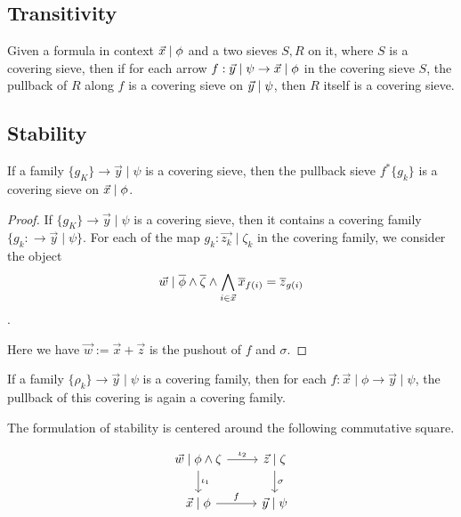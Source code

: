 \subsection{Transitivity}
\begin{lemma}[Transitivity]
  Given a formula in context $\vec{x}\mid\phi$ and a two sieves $S,R$ on it, where $S$ is a covering sieve, then if for each arrow $f:\vec{y}\mid\psi\to\vec{x}\mid\phi$ in the
  covering sieve $S$, the pullback of $R$ along $f$ is a covering sieve on $\vec{y}\mid\psi$, then $R$ itself is a covering sieve.
\end{lemma}



\subsection{Stability}



\begin{theorem}
  If a family $\{g_K\}\to \vec{y}\mid \psi$ is a covering sieve, then the pullback sieve $f^*\{g_k\}$ is a covering sieve on $\vec{x}\mid\phi$.
\end{theorem}

\begin{proof}
  If $\{g_K\}\to \vec{y}\mid \psi$ is a covering sieve, then it contains a covering family $\{g_k: \to \vec{y}\mid \psi\}$.
  For each of the map $g_{k}:\vec{z_k}\mid \zeta_k$ in the covering family, we consider the object 
  \[\vec{w}\mid \overline{\phi}\land \overline{\zeta} \land\bigwedge_{i\in \vec{x}} \overline{x}_{f(i)} = \overline{z}_{g(i)}\]. 

  Here we have $\vec{w}:= \vec{x}+ \vec{z}$ is the pushout of $f$ and $\sigma$.
\end{proof}

\begin{lemma}
  If a family $\{\rho_k\}\to \vec{y}\mid \psi$ is a covering family, then for each $f: \vec{x}\mid \phi\to \vec{y}\mid\psi$, the pullback of this covering is again a covering family.
\end{lemma}





The formulation of stability is centered around the following commutative square.

\[
\begin{tikzcd}
   \vec{w}\mid \phi\land \zeta \ar[r,"\iota_2"]\ar[d,"\iota_1"]  & \vec{z}\mid \zeta\ar[d,"\sigma"]\\
   \vec{x}\mid \phi \ar[r,"f"] & \vec{y}\mid \psi
\end{tikzcd}
\]

